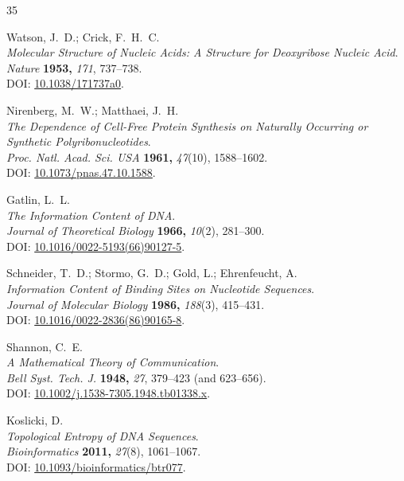 \documentclass{article}
\theoremstyle{remark}
\begin{document}
\begin{thebibliography}{35}

Watson, J.~D.; Crick, F.~H.~C.\\
\textit{Molecular Structure of Nucleic Acids: A Structure for Deoxyribose Nucleic Acid}.\\
\textit{Nature} \textbf{1953,} \textit{171}, 737--738.\\
DOI: \href{https://doi.org/10.1038/171737a0}{10.1038/171737a0}.

Nirenberg, M.~W.; Matthaei, J.~H.\\
\textit{The Dependence of Cell-Free Protein Synthesis on Naturally Occurring or Synthetic Polyribonucleotides}.\\
\textit{Proc. Natl. Acad. Sci. USA} \textbf{1961,} \textit{47}(10), 1588--1602.\\
DOI: \href{https://doi.org/10.1073/pnas.47.10.1588}{10.1073/pnas.47.10.1588}.

Gatlin, L.~L.\\
\textit{The Information Content of DNA}.\\
\textit{Journal of Theoretical Biology} \textbf{1966,} \textit{10}(2), 281--300.\\
DOI: \href{https://doi.org/10.1016/0022-5193(66)90127-5}{10.1016/0022-5193(66)90127-5}.

Schneider, T.~D.; Stormo, G.~D.; Gold, L.; Ehrenfeucht, A.\\
\textit{Information Content of Binding Sites on Nucleotide Sequences}.\\
\textit{Journal of Molecular Biology} \textbf{1986,} \textit{188}(3), 415--431.\\
DOI: \href{https://doi.org/10.1016/0022-2836(86)90165-8}{10.1016/0022-2836(86)90165-8}.

Shannon, C.~E.\\
\textit{A Mathematical Theory of Communication}.\\
\textit{Bell Syst. Tech. J.} \textbf{1948,} \textit{27}, 379--423 (and 623--656).\\
DOI: \href{https://doi.org/10.1002/j.1538-7305.1948.tb01338.x}{10.1002/j.1538-7305.1948.tb01338.x}.

Koslicki, D.\\
\textit{Topological Entropy of DNA Sequences}.\\
\textit{Bioinformatics} \textbf{2011,} \textit{27}(8), 1061--1067.\\
DOI: \href{https://doi.org/10.1093/bioinformatics/btr077}{10.1093/bioinformatics/btr077}.


\end{thebibliography}
\end{document}
